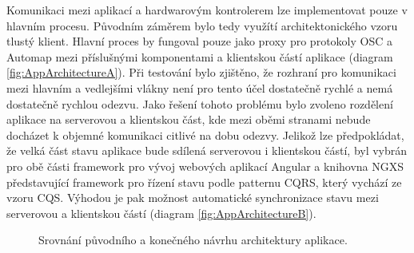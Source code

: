 \documentclass[thesis=M,czech]{FITthesis}[2019/03/06]
\begin{document}
	Komunikaci mezi aplikací a hardwarovým kontrolerem lze implementovat pouze v hlavním procesu. Původním záměrem bylo tedy využítí architektonického vzoru tlustý klient. 
	Hlavní proces by fungoval pouze jako proxy pro protokoly OSC a Automap mezi příslušnými komponentami a klientskou částí aplikace (diagram \ref{fig:AppArchitectureA}).
	Při testování bylo zjištěno, že rozhraní pro komunikaci mezi hlavním a vedlejšími vlákny není pro tento účel dostatečně rychlé a nemá dostatečně rychlou odezvu.
	Jako řešení tohoto problému bylo zvoleno rozdělení aplikace na serverovou a klientskou část, kde mezi oběmi stranami nebude docházet k objemné komunikaci citlivé na dobu odezvy.
	Jelikož lze předpokládat, že velká část stavu aplikace bude sdílená serverovou i klientskou částí, byl vybrán pro obě části framework pro vývoj webových aplikací Angular a knihovna NGXS představující framework pro řízení stavu podle patternu CQRS\cite{cqrs}, který vychází ze vzoru CQS\cite{cqs}. Výhodou je pak možnost automatické synchronizace stavu mezi serverovou a klientskou částí (diagram \ref{fig:AppArchitectureB}).
	
	
	
	
	\begin{figure}
		\centering		
		\qquad
		\caption{Srovnání původního a konečného návrhu architektury aplikace.}
		\label{fig:AppArchitecture}
	\end{figure}
	
\end{document}
